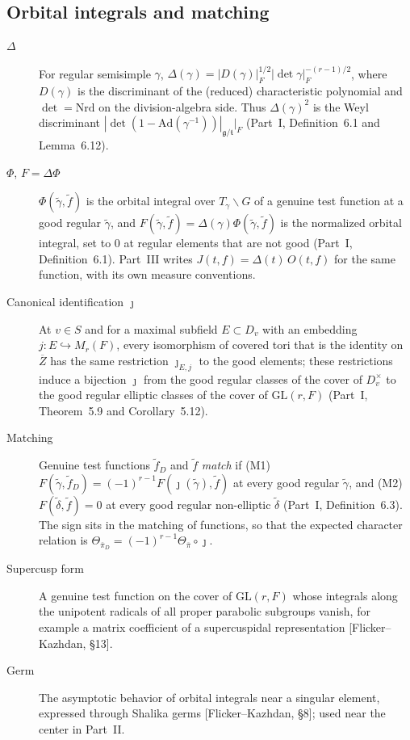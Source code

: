 \subsection{Orbital integrals and matching}\label{gl:matching}
\begin{description}
\item[$\Delta$] For regular semisimple $\gamma$,
$\Delta(\gamma)=|D(\gamma)|_F^{1/2}|\det\gamma|_F^{-(r-1)/2}$, where
$D(\gamma)$ is the discriminant of the (reduced) characteristic
polynomial and $\det=\mathrm{Nrd}$ on the division-algebra side.
Thus $\Delta(\gamma)^2$ is the Weyl discriminant
$|\det(1-\mathrm{Ad}(\gamma^{-1}))|_{\mathfrak g/\mathfrak t}|_F$
(Part~I, Definition~6.1 and Lemma~6.12).
\item[$\Phi$, $F=\Delta\Phi$] $\Phi(\tilde\gamma,\tilde f)$ is the
orbital integral over $T_\gamma\backslash G$ of a genuine test
function at a good regular $\tilde\gamma$, and
$F(\tilde\gamma,\tilde f)=\Delta(\gamma)\Phi(\tilde\gamma,\tilde f)$
is the normalized orbital integral, set to $0$ at regular elements
that are not good (Part~I, Definition~6.1).  Part~III writes
$J(t,f)=\Delta(t)\,O(t,f)$ for the same function, with its own
measure conventions.
\item[Canonical identification $\jmath$] At $v\in S$ and for a maximal
subfield $E\subset D_v$ with an embedding $j:E\hookrightarrow
M_r(F)$, every isomorphism of covered tori that is the identity on
$\overline Z$ has the same restriction $\jmath_{E,j}$ to the good
elements; these restrictions induce a bijection $\jmath$ from the good
regular classes of the cover of $D_v^\times$ to the good regular
elliptic classes of the cover of $\mathrm{GL}(r,F)$ (Part~I,
Theorem~5.9 and Corollary~5.12).
\item[Matching] Genuine test functions $\tilde f_D$ and $\tilde f$
\emph{match} if (M1)
$F(\tilde\gamma,\tilde f_D)=(-1)^{r-1}F(\jmath(\tilde\gamma),\tilde f)$
at every good regular $\tilde\gamma$, and (M2) $F(\tilde\delta,\tilde
f)=0$ at every good regular non-elliptic $\tilde\delta$ (Part~I,
Definition~6.3).  The sign sits in the matching of functions, so that
the expected character relation is
$\Theta_{\overline\pi_D}=(-1)^{r-1}\Theta_{\overline\pi}\circ\jmath$.
\item[Supercusp form] A genuine test function on the cover of
$\mathrm{GL}(r,F)$ whose integrals along the unipotent radicals of
all proper parabolic subgroups vanish, for example a matrix
coefficient of a supercuspidal representation [Flicker--Kazhdan,
\S13].
\item[Germ] The asymptotic behavior of orbital integrals near a
singular element, expressed through Shalika germs [Flicker--Kazhdan,
\S8]; used near the center in Part~II.
\end{description}

